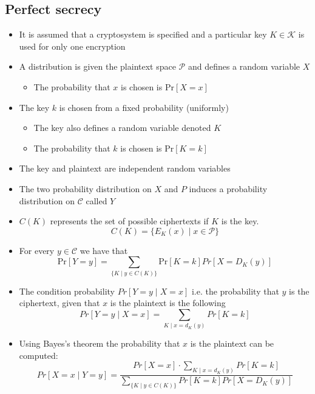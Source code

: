 \message{ !name(crypto-noter.tex)}\documentclass[a4, english]{article}
\begin{document}
\subsection{Perfect secrecy}
\begin{itemize}
	\item It is assumed that a cryptosystem is specified and a particular key $K \in \mathcal K$ is used for only one encryption
  \item A distribution is given the plaintext space $\mathcal P$ and defines a random variable $X$
  \begin{itemize}
  	\item The probability that $x$ is chosen is $\text{Pr}[X=x]$
  \end{itemize}
  \item The key $k$ is chosen from a fixed probability (uniformly)
  \begin{itemize}
  	\item The key also defines a random variable denoted $K$
  	\item The probability that $k$ is chosen is $\text{Pr}[K=k]$
  \end{itemize}
  \item The key and plaintext are independent random variables
  \item The two probability distribution on $X$ and $P$ induces a probability distribution on $\mathcal C$ called $Y$
  \item $C(K)$ represents the set of possible ciphertexts if $K$ is the key.
  \begin{equation*}
    C(K) = \{E_K(x) \mid x \in \mathcal P\}
  \end{equation*}
  \item For every $y \in \mathcal C$ we have that 
  \begin{equation*}
    \text{Pr}[Y=y] = \sum_{\{K \mid y \in C (K)\}} \text{Pr}[K=k] Pr[X = D_K(y)]
  \end{equation*}
  \item The condition probability $Pr[Y=y \mid X=x]$ i.e. the probability that $y$ is the ciphertext, given that $x$ is the plaintext is the following
  \begin{equation*}
    Pr[Y=y \mid X = x] = \sum_{K \mid x = d_K (y)} Pr[K=k]
  \end{equation*} 
  \item Using Bayes's theorem the probability that $x$ is the plaintext can be computed:
  \begin{equation*}
    Pr[X=x \mid Y = y] = \frac{Pr[X=x] \cdot \sum_{K \mid x = d_K (y)} Pr[K=k]}{\sum_{\{K \mid y \in C (K)\}} Pr[K=k] Pr[X = D_K(y)]} 

\end{equation*}
\end{itemize}
\end{document}
